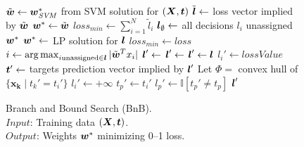 \begin{figure}[t!]
\vspace{-3mm}
\caption{
Branch and Bound Search (BnB).\hfill\; \\
\text{\hspace{1.4cm}} $Input$: Training data $(\boldsymbol{X},\boldsymbol{t})$. \\
\text{\hspace{1.4cm}} $Output$: Weights $\boldsymbol{w}^*$ minimizing 0--1 loss.
}
\label{alg:BnB.Final}
{\footnotesize
\begin{algorithmic}[1]
\State $\tilde{\boldsymbol{w}} \gets \boldsymbol{w}^*_{\mathit{SVM}}$ from SVM solution for $(\boldsymbol{X},\boldsymbol{t})$
\State $\tilde{\boldsymbol{l}} \gets $ loss vector implied by $\tilde{\boldsymbol{w}}$
\State $\boldsymbol{w}^* \gets \tilde{\boldsymbol{w}}$
\State $loss_{min} \gets \sum_{i=1}^N \tilde{l}_i$ 
\State $\boldsymbol{l}_\emptyset \gets $ all decisions $l_i$ unassigned
\State {}
\State \Return $\boldsymbol{w}^*$
\Statex
{}
      \State $\boldsymbol{w}^* \gets$ LP solution for $\boldsymbol{l}$ 
      \State $loss_{min} \gets loss$
   \Else
      \State $i \gets \argmax_{i \text{unassigned} \in \l} |\tilde{\w}^Tx_i|$
      \State $\boldsymbol{l}' \gets$ 
         \State {}
      \EndIf
      \State $\boldsymbol{l}' \gets$ 
         \State {}
      \EndIf
   \EndIf
\EndProcedure
\Statex
{} 
   \State $\boldsymbol{l}' \gets \boldsymbol{l}$
   \State $l_i' \gets lossValue$   
   \State $\boldsymbol{t}' \gets $ targets prediction vector implied by $\boldsymbol{l}'$ 
   \State Let $\Phi =$ convex hull of $\{ \boldsymbol{x_k} \; | \; t_k'=t_i' \}$ 
      \State $l_i' \gets +\infty$ 
   \Else
         \State $t_p' \gets t_i'$ 
         \State $l_p' \gets \mathbb{I} [t_p' \not= t_p]$
      \EndIf
   \EndFor
   \EndIf  
   \State \Return $\boldsymbol{l}'$ 
\EndFunction
\Statex
\EndFunction
\end{algorithmic}}
\vspace{-4mm}
\end{figure}

